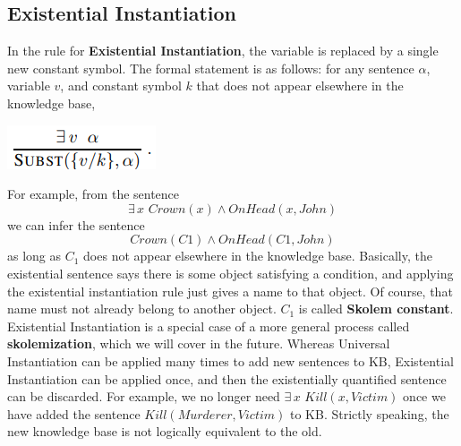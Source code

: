 \subsection{Existential Instantiation}
In the rule for \textbf{Existential Instantiation}, the variable is replaced by a single new constant symbol. The formal statement is as follows: for any sentence $\alpha$, variable $v$, and constant symbol $k$ that does not appear elsewhere in the knowledge base, 
\begin{center}
    \includegraphics[]{images/EI.png}
\end{center}
For example, from the sentence
\[\exists\, x \,\, Crown(x) \land OnHead(x, John)\]
we can infer the sentence
\[Crown(C1) \land OnHead(C1, John)\]
as long as $C_1$ does not appear elsewhere in the knowledge base. Basically, the existential sentence says there is some object satisfying a condition, and applying the existential instantiation rule just gives a name to that object. Of course, that name must not already belong to another object. $C_1$ is called \textbf{Skolem constant}. Existential Instantiation is a special case of a more general process called \textbf{skolemization}, which we will cover in the future.
\newline\newline
Whereas Universal Instantiation can be applied many times to add new sentences to KB, Existential Instantiation can be applied once, and then the existentially quantified sentence can be discarded. For example, we no longer need $\exists \, x \,\, Kill(x, Victim)$ once we have added the sentence $Kill(Murderer , Victim)$ to KB. Strictly speaking, the new knowledge base is not logically equivalent to the old.

